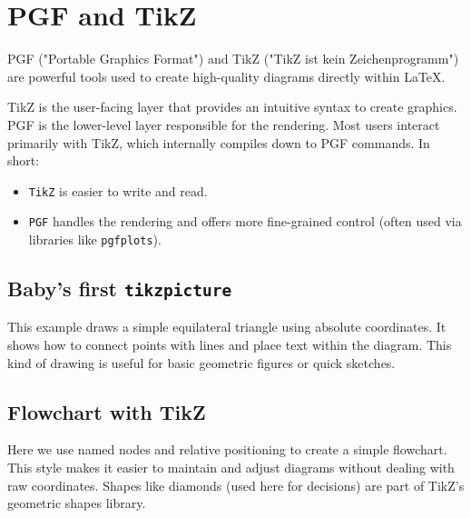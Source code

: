 \chapter{PGF and TikZ}

PGF ("Portable Graphics Format") and TikZ ("TikZ ist kein Zeichenprogramm") are powerful tools used to create high-quality diagrams directly within LaTeX.

TikZ is the user-facing layer that provides an intuitive syntax to create graphics. PGF is the lower-level layer responsible for the rendering. Most users interact primarily with TikZ, which internally compiles down to PGF commands. In short:

\begin{itemize}
    \item \texttt{TikZ} is easier to write and read.
    \item \texttt{PGF} handles the rendering and offers more fine-grained control (often used via libraries like \texttt{pgfplots}).
\end{itemize}

\section{Baby's first \texttt{tikzpicture}}

This example draws a simple equilateral triangle using absolute coordinates. It shows how to connect points with lines and place text within the diagram. This kind of drawing is useful for basic geometric figures or quick sketches.


\section{Flowchart with TikZ}

Here we use named nodes and relative positioning to create a simple flowchart. This style makes it easier to maintain and adjust diagrams without dealing with raw coordinates. Shapes like diamonds (used here for decisions) are part of TikZ's geometric shapes library.



